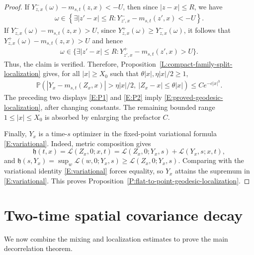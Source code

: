 \documentclass[12pt, reqno]{amsart}
\numberwithin{equation}{section}
\theoremstyle{definition}
\newcommand{\h}{\mathfrak{h}}
\newcommand{\Prob}{\mathbb{P}}
\newcommand{\Lcal}{\mathcal{L}}
\begin{document}
\begin{proof}
  If $ Y_{z,x}^-(\omega) -m_{s,t}(z,x)<-U$, then since $|z-x|\leq R$, we have
  \begin{align*}
    \omega\in \left\{\exists |z'-x| \leq R: Y^-_{z',x}-m_{s,t}(z',x) <-U\right\}.
  \end{align*}
  If $ Y_{z,x}^-(\omega) -m_{s,t}(z,x)>U$, since $Y_{z,x}^+(\omega) \geq
  Y_{z,x}^-(\omega)$, it follows that $ Y_{z,x}^+(\omega) -m_{s,t}(z,x)>U$ and
  hence
     \begin{align*}
  \omega\in \{\exists |z'-x| \leq R: Y^+_{z',x}-m_{s,t}(z',x) >U\}.
  \end{align*}
  Thus, the claim is verified. Therefore,
  Proposition~\ref{L:compact-family-split-localization} gives, for all $|x| \geq
  X_0$ such that $\theta|x|, \eta|x|/2\ge1$,
  \begin{align}\label{E:P2}
    \Prob\left(|Y_x-m_{s,t}(Z_x,x)|>\eta |x|/2,\ |Z_x-x|\le\theta |x|\right)
    \le C e^{-c |x|^3}.
  \end{align}
  The preceding two displays \eqref{E:P1} and \eqref{E:P2} imply
  \eqref{E:proved-geodesic-localization}, after changing constants.  The
  remaining bounded range $1\le |x|\le X_0$ is absorbed by enlarging the
  prefactor $C$.

  Finally, $Y_x$ is a time-$s$ optimizer in the fixed-point variational formula
  \eqref{E:variational}. Indeed, metric composition gives
  \[
    \h(t,x)=\Lcal(Z_x,0;x,t)
    =\Lcal(Z_x,0;Y_x,s)+\Lcal(Y_x,s;x,t),
  \]
  and $\h(s,Y_x)=\sup_w\Lcal(w,0;Y_x,s)\ge\Lcal(Z_x,0;Y_x,s)$.  Comparing with
  the variational identity \eqref{E:variational} forces equality, so $Y_x$
  attains the supremum in \eqref{E:variational}. This proves
  Proposition~\ref{P:flat-to-point-geodesic-localization}.
\end{proof}


\section{Two-time spatial covariance decay}
\label{S:covariance-proof}

We now combine the mixing and localization estimates to prove the main
decorrelation theorem.
\end{document}
